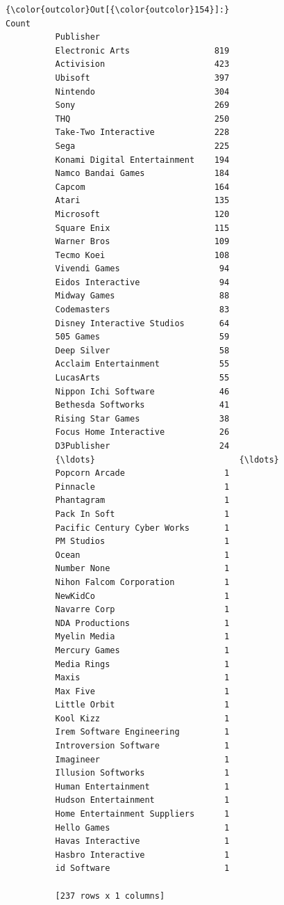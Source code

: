 \documentclass[11pt]{article}
\begin{document}
\begin{Verbatim}[commandchars=\\\{\}]
{\color{outcolor}Out[{\color{outcolor}154}]:}                               Count
          Publisher                          
          Electronic Arts                 819
          Activision                      423
          Ubisoft                         397
          Nintendo                        304
          Sony                            269
          THQ                             250
          Take-Two Interactive            228
          Sega                            225
          Konami Digital Entertainment    194
          Namco Bandai Games              184
          Capcom                          164
          Atari                           135
          Microsoft                       120
          Square Enix                     115
          Warner Bros                     109
          Tecmo Koei                      108
          Vivendi Games                    94
          Eidos Interactive                94
          Midway Games                     88
          Codemasters                      83
          Disney Interactive Studios       64
          505 Games                        59
          Deep Silver                      58
          Acclaim Entertainment            55
          LucasArts                        55
          Nippon Ichi Software             46
          Bethesda Softworks               41
          Rising Star Games                38
          Focus Home Interactive           26
          D3Publisher                      24
          {\ldots}                             {\ldots}
          Popcorn Arcade                    1
          Pinnacle                          1
          Phantagram                        1
          Pack In Soft                      1
          Pacific Century Cyber Works       1
          PM Studios                        1
          Ocean                             1
          Number None                       1
          Nihon Falcom Corporation          1
          NewKidCo                          1
          Navarre Corp                      1
          NDA Productions                   1
          Myelin Media                      1
          Mercury Games                     1
          Media Rings                       1
          Maxis                             1
          Max Five                          1
          Little Orbit                      1
          Kool Kizz                         1
          Irem Software Engineering         1
          Introversion Software             1
          Imagineer                         1
          Illusion Softworks                1
          Human Entertainment               1
          Hudson Entertainment              1
          Home Entertainment Suppliers      1
          Hello Games                       1
          Havas Interactive                 1
          Hasbro Interactive                1
          id Software                       1
          
          [237 rows x 1 columns]
\end{Verbatim}
            
\end{document}
